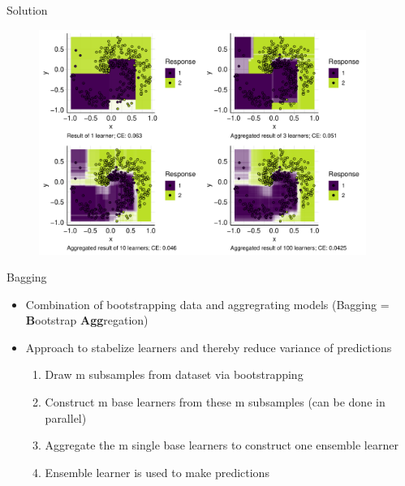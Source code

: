 \begin{vbframe}{Solution}
\begin{figure}
\includegraphics[width=0.95\textwidth]{figure/cart_forest_overview_6.pdf}
\end{figure}
\end{vbframe}

\begin{vbframe}{Bagging}
\begin{itemize}
  \item Combination of bootstrapping data and aggregrating models (Bagging = \textbf{B}ootstrap \textbf{Agg}regation)
  \item Approach to stabelize learners and thereby reduce variance of predictions
\begin{enumerate}
  \item Draw m subsamples from dataset via bootstrapping
  \item Construct m base learners from these m subsamples (can be done in parallel)
  \item Aggregate the m single base learners to construct one ensemble learner
  \item Ensemble learner is used to make predictions
\end{enumerate}
\end{itemize}
\end{vbframe}


